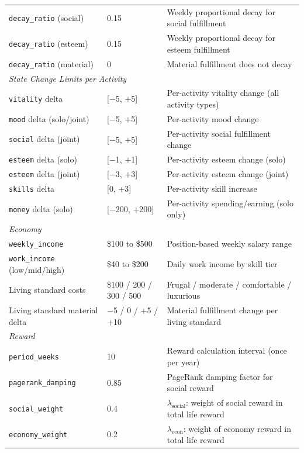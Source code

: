 \begin{table}[htbp]
{\begin{tabular}{p{4.2cm} p{1.8cm} p{7.2cm}}
\texttt{decay\_ratio} (social) & 0.15 & Weekly proportional decay for social fulfillment \\
\texttt{decay\_ratio} (esteem) & 0.15 & Weekly proportional decay for esteem fulfillment \\
\texttt{decay\_ratio} (material) & 0 & Material fulfillment does not decay \\
\midrule
\multicolumn{3}{l}{\textit{State Change Limits per Activity}} \\
\texttt{vitality} delta & [$-$5, $+$5] & Per-activity vitality change (all activity types) \\
\texttt{mood} delta (solo/joint) & [$-$5, $+$5] & Per-activity mood change \\
\texttt{social} delta (joint) & [$-$5, $+$5] & Per-activity social fulfillment change \\
\texttt{esteem} delta (solo) & [$-$1, $+$1] & Per-activity esteem change (solo) \\
\texttt{esteem} delta (joint) & [$-$3, $+$3] & Per-activity esteem change (joint) \\
\texttt{skills} delta & [0, $+$3] & Per-activity skill increase \\
\texttt{money} delta (solo) & [$-$200, $+$200] & Per-activity spending/earning (solo only) \\
\midrule
\multicolumn{3}{l}{\textit{Economy}} \\
\texttt{weekly\_income} & \$100 to \$500 & Position-based weekly salary range \\
\texttt{work\_income} (low/mid/high) & \$40 to \$200 & Daily work income by skill tier \\
Living standard costs & \$100 / 200 / 300 / 500 & Frugal / moderate / comfortable / luxurious \\
Living standard material delta & $-$5 / 0 / $+$5 / $+$10 & Material fulfillment change per living standard \\
\midrule
\multicolumn{3}{l}{\textit{Reward}} \\
\texttt{period\_weeks} & 10 & Reward calculation interval (once per year) \\
\texttt{pagerank\_damping} & 0.85 & PageRank damping factor for social reward \\
\texttt{social\_weight} & 0.4 & $\lambda_{\text{social}}$: weight of social reward in total life reward \\
\texttt{economy\_weight} & 0.2 & $\lambda_{\text{econ}}$: weight of economy reward in total life reward \\

\end{tabular}}
\end{table}
